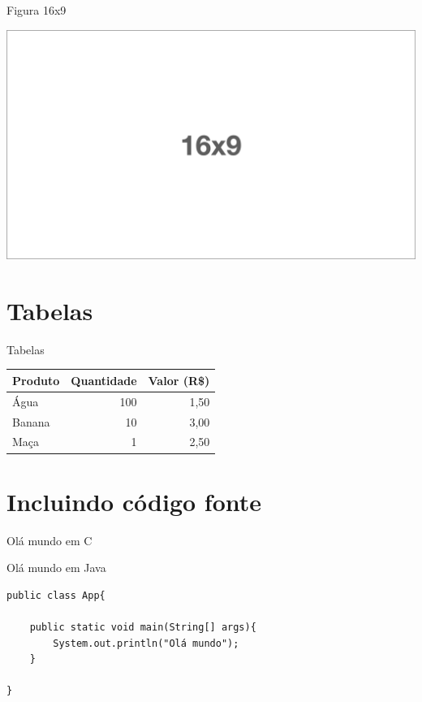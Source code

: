 \documentclass[aspectratio=169]{beamer}
\begin{document}
\begin{frame}{Figura 16x9}
\begin{center}
    \includegraphics[width=.95\linewidth]{figs/16x9.png}
\end{center}
\end{frame}

\section{Tabelas}

\begin{frame}{Tabelas}
\begin{center}
    \begin{tabular}{l r r}\\\toprule
        Produto & Quantidade & Valor (R\$) \\\midrule
        Água    &      100   &   1,50 \\ 
        Banana  &       10   &   3,00 \\
        Maça    &        1   &   2,50 \\ \bottomrule
    \end{tabular}
\end{center}
\end{frame}

\section{Incluindo código fonte}


\begin{frame}[fragile]{Olá mundo em C}
    
\end{frame}

\begin{frame}[fragile]{Olá mundo em Java}
\begin{lstlisting}[style=java]
public class App{

    public static void main(String[] args){
        System.out.println("Olá mundo");
    }

}
\end{lstlisting}
\end{frame}
\end{document}

